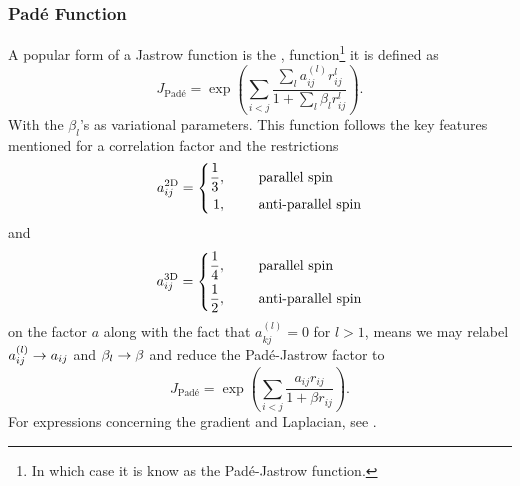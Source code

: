     \subsubsection{Pad\'e Function\label{sususec:TWFPadeJastrow}} 
    A popular form of a Jastrow function is the ,
    function\footnote{In which case it is know as the Pad\'e-Jastrow function.}
    it is defined as\cite{basicMB, MCAbInitoChem}
            \begin{equation}
                J_{\text{Pad\'e}} =
                \exp\left(\sum\limits_{i<j}\frac{\sum\limits_la^{(l)}_{ij}
                r^l_{ij}}{1 + \sum\limits_l \beta_l r^l_{ij}}\right).
            \end{equation}
        With the $\beta_l$'s as variational parameters. This function follows
        the key features mentioned for a correlation factor and the
        restrictions
            \begin{equation}
                a^{\text{2D}}_{ij} = \left\{\begin{aligned}
                        \frac{1}{3},&\indent& &\text{parallel spin} \\
                        1,&\indent& &\text{anti-parallel spin}
                    \end{aligned}\right.
            \end{equation}
        and
            \begin{equation}
                a^{\text{3D}}_{ij} = \left\{\begin{aligned}
                        \frac{1}{4},&\indent& &\text{parallel spin} \\
                        \frac{1}{2},&\indent& &\text{anti-parallel spin}
                    \end{aligned}\right.
            \end{equation}
        on the factor $a$ along with the fact that $a^{(l)}_{kj}=0$ for $l>1$,
        means we may relabel $a^{(l)}_{ij}\rightarrow a_{ij}$ and $\beta_l\rightarrow
        \beta$ and reduce the Pad\'e-Jastrow factor to
            \begin{equation}
                J_{\text{Pad\'e}} = \exp\left(\sum\limits_{i<j}\frac{a_{ij}
                r_{ij}}{1 + \beta r_{ij}}\right).
                \label{eq:padereduceddef}
            \end{equation}
        For expressions concerning the gradient and Laplacian, see
        .

